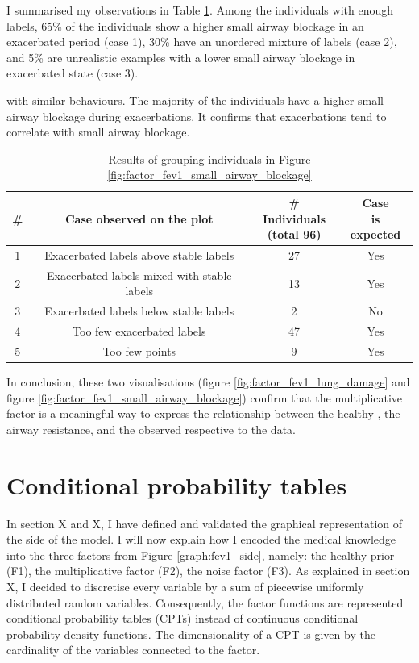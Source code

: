 I summarised my observations in Table \ref{tab:n_ex_labels}. Among the individuals with enough labels, 65\% of the individuals show a higher small airway blockage in an exacerbated period (case 1), 30\% have an unordered mixture of labels (case 2), and 5\% are unrealistic examples with a lower small airway blockage in exacerbated state (case 3).
\begin{table}
\centering
\label{tab:n_ex_labels}
\caption{Results of grouping individuals in Figure \ref{fig:factor_fev1_small_airway_blockage}} with similar behaviours. The majority of the individuals have a higher small airway blockage during exacerbations. It confirms that exacerbations tend to correlate with small airway blockage.
\begin{tabular}{c|c|c|c}
\textbf{\#} & \textbf{Case observed on the plot}& \specialcell{\textbf{\# Individuals}\\\textbf{(total 96)}} & \specialcell{\textbf{Case}\\\textbf{is expected}} \\
\hline
1 & Exacerbated labels above stable labels      & 27                       & Yes                \\
2 & Exacerbated labels mixed with stable labels & 13                       & Yes                  \\
3 &Exacerbated labels below stable labels      & 2                        & No                   \\
4 & Too few exacerbated labels                  & 47                       & Yes                  \\
5 & Too few points                              & 9                        & Yes                  
\end{tabular}
\end{table}

In conclusion, these two visualisations (figure \ref{fig:factor_fev1_lung_damage} and figure \ref{fig:factor_fev1_small_airway_blockage}) confirm that the multiplicative factor is a meaningful way to express the relationship between the healthy \F, the airway resistance, and the observed \F respective to the data.

\section{Conditional probability tables}
In section X and X, I have defined and validated the graphical representation of the \F side of the model. I will now explain how I encoded the medical knowledge into the three factors  from Figure \ref{graph:fev1_side}, namely: the healthy \F prior (F1), the multiplicative factor (F2), the noise factor (F3). As explained in section X, I decided to discretise every variable by a sum of piecewise uniformly distributed random variables. Consequently, the factor functions are represented conditional probability tables (CPTs) instead of continuous conditional probability density functions. The dimensionality of a CPT is given by the cardinality of the variables connected to the factor. 

